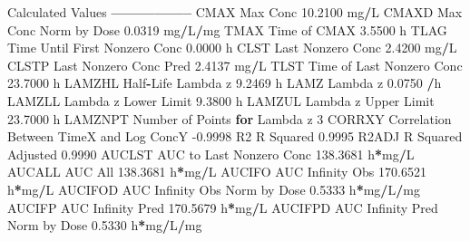\documentclass[12pt,]{krantz}
\newenvironment{Shaded}{\begin{snugshade}}{\end{snugshade}}
\newcommand{\ControlFlowTok}[1]{\textcolor[rgb]{0.13,0.29,0.53}{\textbf{#1}}}
\newcommand{\DecValTok}[1]{\textcolor[rgb]{0.00,0.00,0.81}{#1}}
\newcommand{\FloatTok}[1]{\textcolor[rgb]{0.00,0.00,0.81}{#1}}
\newcommand{\NormalTok}[1]{#1}
\newcommand{\OperatorTok}[1]{\textcolor[rgb]{0.81,0.36,0.00}{\textbf{#1}}}
\begin{document}
\begin{Shaded}
\begin{Highlighting}[]
{{{{{{{{{{{{{{{{{{{{{{{{{{{{{{{{{{{{\NormalTok{Calculated Values}
\OperatorTok{-----------------}
\NormalTok{CMAX       Max Conc                                       }\FloatTok{10.2100}\NormalTok{ mg}\OperatorTok{/}\NormalTok{L}
\NormalTok{CMAXD      Max Conc Norm by Dose                           }\FloatTok{0.0319}\NormalTok{ mg}\OperatorTok{/}\NormalTok{L}\OperatorTok{/}\NormalTok{mg}
\NormalTok{TMAX       Time of CMAX                                    }\FloatTok{3.5500}\NormalTok{ h}
\NormalTok{TLAG       Time Until First Nonzero Conc                   }\FloatTok{0.0000}\NormalTok{ h}
\NormalTok{CLST       Last Nonzero Conc                               }\FloatTok{2.4200}\NormalTok{ mg}\OperatorTok{/}\NormalTok{L}
\NormalTok{CLSTP      Last Nonzero Conc Pred                          }\FloatTok{2.4137}\NormalTok{ mg}\OperatorTok{/}\NormalTok{L}
\NormalTok{TLST       Time of Last Nonzero Conc                      }\FloatTok{23.7000}\NormalTok{ h}
\NormalTok{LAMZHL     Half}\OperatorTok{-}\NormalTok{Life Lambda z                              }\FloatTok{9.2469}\NormalTok{ h}
\NormalTok{LAMZ       Lambda z                                        }\FloatTok{0.0750} \OperatorTok{/}\NormalTok{h}
\NormalTok{LAMZLL     Lambda z Lower Limit                            }\FloatTok{9.3800}\NormalTok{ h}
\NormalTok{LAMZUL     Lambda z Upper Limit                           }\FloatTok{23.7000}\NormalTok{ h}
\NormalTok{LAMZNPT    Number of Points }\ControlFlowTok{for}\NormalTok{ Lambda z                   }\DecValTok{3}
\NormalTok{CORRXY     Correlation Between TimeX and Log ConcY        }\FloatTok{-0.9998} 
\NormalTok{R2         R Squared                                       }\FloatTok{0.9995} 
\NormalTok{R2ADJ      R Squared Adjusted                              }\FloatTok{0.9990} 
\NormalTok{AUCLST     AUC to Last Nonzero Conc                      }\FloatTok{138.3681}\NormalTok{ h}\OperatorTok{*}\NormalTok{mg}\OperatorTok{/}\NormalTok{L}
\NormalTok{AUCALL     AUC All                                       }\FloatTok{138.3681}\NormalTok{ h}\OperatorTok{*}\NormalTok{mg}\OperatorTok{/}\NormalTok{L}
\NormalTok{AUCIFO     AUC Infinity Obs                              }\FloatTok{170.6521}\NormalTok{ h}\OperatorTok{*}\NormalTok{mg}\OperatorTok{/}\NormalTok{L}
\NormalTok{AUCIFOD    AUC Infinity Obs Norm by Dose                   }\FloatTok{0.5333}\NormalTok{ h}\OperatorTok{*}\NormalTok{mg}\OperatorTok{/}\NormalTok{L}\OperatorTok{/}\NormalTok{mg}
\NormalTok{AUCIFP     AUC Infinity Pred                             }\FloatTok{170.5679}\NormalTok{ h}\OperatorTok{*}\NormalTok{mg}\OperatorTok{/}\NormalTok{L}
\NormalTok{AUCIFPD    AUC Infinity Pred Norm by Dose                  }\FloatTok{0.5330}\NormalTok{ h}\OperatorTok{*}\NormalTok{mg}\OperatorTok{/}\NormalTok{L}\OperatorTok{/}\NormalTok{mg}
}}}}}}}}}}}}}}}}}}}}}}}}}}}}}}}}}}}}
\end{Highlighting}
\end{Shaded}
\end{document}
